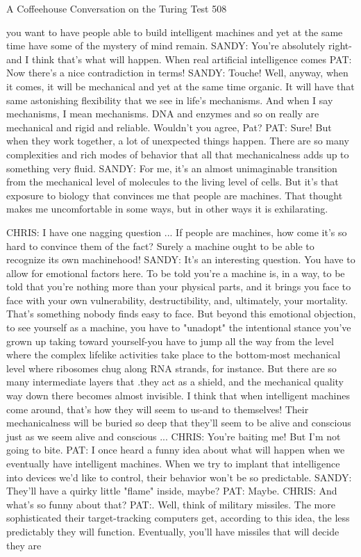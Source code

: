 A Coffeehouse Conversation on the Turing Test                                       508

   you want to have people able to build intelligent machines and yet at the same
   time have some of the mystery of mind remain.
SANDY: You're absolutely right-and I think that's what will happen. When real
   artificial intelligence comes
PAT: Now there's a nice contradiction in terms!
SANDY: Touche! Well, anyway, when it comes, it will be mechanical and yet at the
   same time organic. It will have that same astonishing flexibility that we see in
   life's mechanisms. And when I say mechanisms, I mean mechanisms. DNA and
   enzymes and so on really are mechanical and rigid and reliable. Wouldn't you
   agree, Pat?
PAT: Sure! But when they work together, a lot of unexpected things happen. There
   are so many complexities and rich modes of behavior that all that mechanicalness
   adds up to something very fluid.
SANDY: For me, it's an almost unimaginable transition from the mechanical level of
   molecules to the living level of cells. But it's that exposure to biology that
   convinces me that people are machines. That thought makes me uncomfortable in
   some ways, but in other ways it is exhilarating.

CHRIS: I have one nagging question ... If people are machines, how come it's so hard
   to convince them of the fact? Surely a machine ought to be able to recognize its
   own machinehood!
SANDY: It's an interesting question. You have to allow for emotional factors here. To
   be told you're a machine is, in a way, to be told that you're nothing more than
   your physical parts, and it brings you face to face with your own vulnerability,
   destructibility, and, ultimately, your mortality. That's something nobody finds
   easy to face. But beyond this emotional objection, to see yourself as a machine,
   you have to "unadopt" the intentional stance you've grown up taking toward
   yourself-you have to jump all the way from the level where the complex lifelike
   activities take place to the bottom-most mechanical level where ribosomes chug
   along RNA strands, for instance. But there are so many intermediate layers that
   .they act as a shield, and the mechanical quality way down there becomes almost
   invisible. I think that when intelligent machines come around, that's how they
   will seem to us-and to themselves! Their mechanicalness will be buried so deep
   that they'll seem to be alive and conscious just as we seem alive and conscious ...
CHRIS: You're baiting me! But I'm not going to bite.
PAT: I once heard a funny idea about what will happen when we eventually have
   intelligent machines. When we try to implant that intelligence into devices we'd
   like to control, their behavior won't be so predictable. SANDY: They'll have a
   quirky little "flame" inside, maybe? PAT: Maybe.
CHRIS: And what's so funny about that?
PAT:. Well, think of military missiles. The more sophisticated their target-tracking
   computers get, according to this idea, the less predictably they will function.
   Eventually, you'll have missiles that will decide they are




